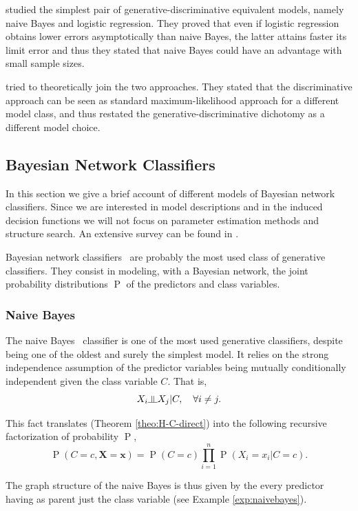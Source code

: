 \documentclass[11pt,a4paper, twoside]{book}
\newcommand{\indep}{\rotatebox[origin=c]{90}{$\models$}}
\newcommand{\Pp}{\operatorname{P}}
\newcommand{\bx}{\mathbf{x}}
\newcommand{\bX}{\mathbf{X}}
\begin{document}
\cite{Ng2001} studied the simplest pair of generative-discriminative equivalent models, namely naive Bayes and logistic regression. They proved that even if logistic regression obtains lower errors asymptotically than naive Bayes, the latter attains faster its limit error and thus they stated that naive Bayes could have an advantage with small sample sizes. 

\cite{lasserre2007} tried to theoretically join the two approaches. They stated that the discriminative approach can be seen as standard maximum-likelihood approach for a different model class, and thus restated the generative-discriminative dichotomy as a different model choice.


\subsection{Bayesian Network Classifiers}
\label{sec:bnclassifier}
In this section we give a brief account of different models of Bayesian network classifiers. Since we are interested in model descriptions and in the induced decision functions we will not focus  on parameter estimation methods and structure search. An extensive survey can be found in \cite{bielza2014}.

Bayesian network classifiers~\citep{Friedman1997} are probably the most used class of generative classifiers. They consist in modeling, with a Bayesian network, the joint probability distributions $\Pp$ of the predictors and class variables.
 
\subsubsection{Naive Bayes}

The naive Bayes~\citep{Minsky61stepstoward} classifier is one of the most used generative classifiers, despite being one of the oldest and surely the simplest model.
It relies on the strong independence assumption of the predictor variables being mutually conditionally independent given the class variable $C$.
That is,
$$ X_i \indep X_j | C, \quad \forall i \neq j .$$ 

This fact translates (Theorem \ref{theo:H-C-direct}) into the following recursive factorization of probability $\Pp$,
$$ \Pp(C=c, \bX = \bx) = \Pp(C=c) \prod_{i=1}^{n} \Pp(X_i=x_i| C =c).$$

The graph structure of the naive Bayes is thus given by the every predictor having as parent just the class variable (see Example \ref{exp:naivebayes}).
\end{document}
